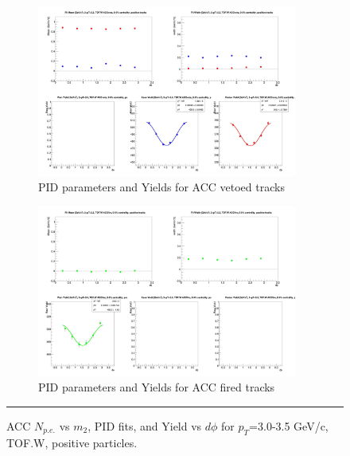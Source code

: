 \begin{figure}[H]
  \ContinuedFloat
    \begin{subfigure}{1\textwidth}
   \centering
   \includegraphics[width=0.94\textwidth]{hiptfits/pos/fitParams_tof2_cent0_ch1_pT-30-35.jpg}
    \caption{PID parameters and Yields for ACC vetoed tracks}
    \end{subfigure}    
    \begin{subfigure}{1\textwidth}
   \centering
   \includegraphics[width=0.94\textwidth]{hiptfits/pos/fitParams_tof3_cent0_ch1_pT-30-35.jpg}
    \caption{PID parameters and Yields for ACC fired tracks}
    \end{subfigure} 
    \rule{35em}{0.5pt}
  \caption[ACC $N_{p.e.}$ vs $m_2$, PID fits, and Yield vs $d\phi$ for $p_T$=3.0-3.5 GeV/c, TOF.W, positive particles.]{ACC $N_{p.e.}$ vs $m_2$, PID fits, and Yield vs $d\phi$ for $p_T$=3.0-3.5 GeV/c, TOF.W, positive particles.}
  \label{fig:acc30-35pos}
\end{figure}


